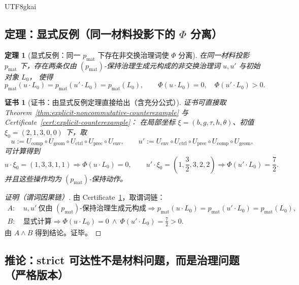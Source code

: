 \documentclass[12pt]{article}
\newtheorem{theorem}{定理}[section]
\newtheorem{certificate}{证书}[section]
\begin{document}
\begin{CJK*}{UTF8}{gkai}
\subsection{定理：显式反例（同一材料投影下的 $\Phi$ 分离）}

\begin{theorem}[显式反例：同一 $p_{\mathrm{mat}}$ 下存在非交换治理词使 $\Phi$ 分离]
\label{thm:markdown-explicit-counterexample}
在同一材料投影 $p_{\mathrm{mat}}$ 下，存在两条仅由 $(p_{\mathrm{mat}})$-保持治理生成元构成的非交换治理词 $u,u'$ 与初始对象 $L_0$，
使得
\[
p_{\mathrm{mat}}(u\cdot L_0)=p_{\mathrm{mat}}(u'\cdot L_0)=p_{\mathrm{mat}}(L_0),
\qquad
\Phi(u\cdot L_0)=0,\quad \Phi(u'\cdot L_0)>0.
\]
\end{theorem}

\begin{certificate}[证书：由显式反例定理直接给出（含充分公式）]
\label{cert:markdown-explicit-counterexample}
证书可直接取 Theorem~\ref{thm:explicit-noncommutative-counterexample} 与 Certificate~\ref{cert:explicit-counterexample}：
在局部坐标 $\xi=(b,g,\tau,h,\theta)$、初值 $\xi_0=(2,1,3,0,0)$ 下，取
\[
u:=U_{\mathrm{comp}}\circ U_{\mathrm{geom}}\circ U_{\mathrm{ctrl}}\circ U_{\mathrm{prec}}\circ U_{\mathrm{env}},
\qquad
u':=U_{\mathrm{env}}\circ U_{\mathrm{ctrl}}\circ U_{\mathrm{prec}}\circ U_{\mathrm{comp}}\circ U_{\mathrm{geom}},
\]
可计算得到
\[
u\cdot \xi_0=(1,3,3,1,1)\Rightarrow \Phi(u\cdot L_0)=0,
\qquad
u'\cdot \xi_0=\left(1,\frac{3}{2},3,2,2\right)\Rightarrow \Phi(u'\cdot L_0)=\frac{7}{2}.
\]
并且这些操作均为 $(p_{\mathrm{mat}})$-保持动作。
\end{certificate}

\begin{proof}[证明（谓词因果链）]
由 Certificate~\ref{cert:markdown-explicit-counterexample}，取谓词链：
\[
\begin{aligned}
A:&\ u,u'\ \text{仅由 }(p_{\mathrm{mat}})\text{-保持治理生成元构成}\Rightarrow p_{\mathrm{mat}}(u\cdot L_0)=p_{\mathrm{mat}}
  (u'\cdot L_0)=p_{\mathrm{mat}}(L_0),\\
B:&\ \text{显式计算}\Rightarrow \Phi(u\cdot L_0)=0\ \wedge\ \Phi(u'\cdot L_0)=\frac{7}{2}>0.
\end{aligned}
\]
由 $A\wedge B$ 得到结论。证毕。
\end{proof}

\subsection{推论：strict 可达性不是材料问题，而是治理问题（严格版本）}


\end{CJK*}
\end{document}
